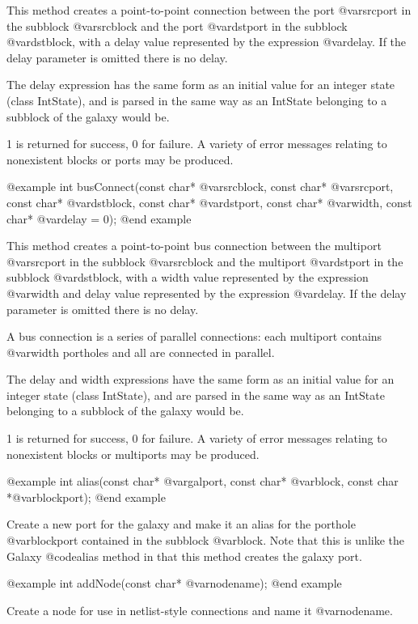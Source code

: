 This method creates a point-to-point connection between the port
@var{srcport} in the subblock @var{srcblock} and the port @var{dstport}
in the subblock @var{dstblock}, with a delay value represented by
the expression @var{delay}.
If the delay parameter is omitted there is no delay.

The delay expression has the same form as an initial value for an
integer state (class IntState), and is parsed in the same way as
an IntState belonging to a subblock of the galaxy would be.

1 is returned for success, 0 for failure.
A variety of error messages relating to nonexistent blocks or ports
may be produced.

@example
int busConnect(const char* @var{srcblock}, const char* @var{srcport},
               const char* @var{dstblock}, const char* @var{dstport},
               const char* @var{width}, const char* @var{delay} = 0);
@end example

This method creates a point-to-point bus connection between the multiport
@var{srcport} in the subblock @var{srcblock} and the multiport @var{dstport}
in the subblock @var{dstblock}, with a width value represented by the
expression @var{width} and delay value represented by
the expression @var{delay}.  If the delay parameter is omitted there is
no delay.

A bus connection is a series of parallel connections: each multiport
contains @var{width} portholes and all are connected in parallel.

The delay and width expressions have the same form as an initial value for an
integer state (class IntState), and are parsed in the same way as
an IntState belonging to a subblock of the galaxy would be.

1 is returned for success, 0 for failure.
A variety of error messages relating to nonexistent blocks or multiports
may be produced.

@example
int alias(const char* @var{galport}, const char* @var{block}, const char *@var{blockport});
@end example

Create a new port for the galaxy and make it an alias for the porthole
@var{blockport} contained in the subblock @var{block}.  Note that this
is unlike the Galaxy @code{alias} method in that this method creates
the galaxy port.

@example
int addNode(const char* @var{nodename});
@end example

Create a node for use in netlist-style connections and name it
@var{nodename}.

